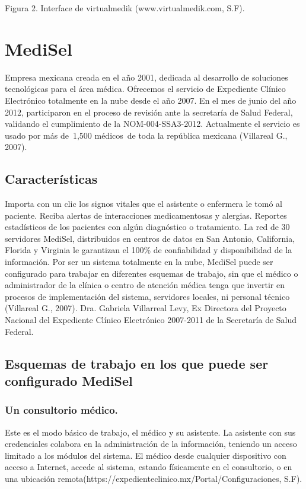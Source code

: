                                   		  Figura 2. Interface de virtualmedik (www.virtualmedik.com, S.F).




\section{MediSel}
Empresa mexicana creada en el año 2001, dedicada al desarrollo de soluciones tecnológicas para el área médica.
Ofrecemos el servicio de Expediente Clínico Electrónico totalmente en la nube desde el año 2007. En el mes de junio del año 2012, participaron en el proceso de revisión ante la secretaría de Salud Federal, validando el cumplimiento de la NOM-004-SSA3-2012.
Actualmente el servicio es usado por más de 1,500 médicos de toda la república mexicana (Villareal G., 2007).
\subsection{Características}
Importa con un clic los signos vitales que el asistente o enfermera le tomó al paciente. Reciba alertas de interacciones medicamentosas y alergias. Reportes estadísticos de los pacientes con algún diagnóstico o tratamiento. La red de 30 servidores MediSel, distribuidos en centros de datos en San Antonio, California, Florida y Virginia le garantizan el 100\% de confiabilidad y disponibilidad de la información. Por ser un sistema totalmente en la nube, MediSel puede ser configurado para trabajar en diferentes esquemas de trabajo, sin que el médico o administrador de la clínica o centro de atención médica tenga que invertir en procesos de implementación del sistema, servidores locales, ni personal técnico (Villareal G., 2007).
Dra. Gabriela Villarreal Levy, Ex Directora del Proyecto Nacional del Expediente Clínico Electrónico 2007-2011 de la Secretaría de Salud Federal.

\subsection{Esquemas de trabajo en los que puede ser configurado MediSel}

\subsubsection{Un consultorio médico.}
Este es el modo básico de trabajo, el médico y su asistente. La asistente con sus credenciales colabora en la administración de la información, teniendo un acceso limitado a los módulos del sistema. El médico desde cualquier dispositivo con acceso a Internet, accede al sistema, estando físicamente en el consultorio, o en una ubicación remota(https://expedienteclinico.mx/Portal/Configuraciones, S.F).



